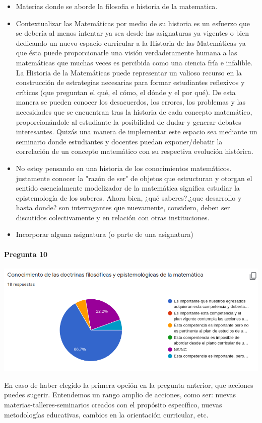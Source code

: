 \documentclass[a4paper,10pt,BCOR10mm,oneside,headsepline]{scrbook}
\begin{document}
\begin{subappendices}
\begin{itemize}
\item Materias donde se aborde la filosofia e historia de la matematica.

\item Contextualizar las Matemáticas por medio de su historia es un esfuerzo que se debería al menos intentar ya sea desde las asignaturas ya vigentes o bien dedicando un nuevo espacio curricular  a la Historia de las Matemáticas ya que ésta puede proporcionarle una visión verdaderamente humana a las matemáticas que muchas veces es percibida como una ciencia fría e infalible.  
La Historia de la Matemáticas puede representar un valioso recurso en la construcción de estrategias necesarias para formar estudiantes reflexivos y críticos (que preguntan el qué, el cómo, el dónde y el por qué). De esta manera se pueden conocer los desacuerdos, los errores, los problemas y las necesidades que se encuentran tras la historia de cada concepto matemático,  proporcionándole al estudiante la posibilidad de dudar y generar debates interesantes. Quizás una manera de implementar este espacio sea mediante un seminario donde estudiantes y docentes puedan exponer/debatir la correlación de un concepto matemático con su respectiva evolución histórica.  

\item No estoy pensando en una historia de los conocimientos matemáticos. justamente conocer la "razón de ser" de objetos  que estructuran y otorgan el sentido esencialmente modelizador de la matemática significa estudiar la epistemología de los saberes.  Ahora bien, ¿qué saberes?,¿que desarrollo y hasta donde? son interrogantes que nuevamente, considero, deben ser discutidos colectivamente y en relación con otras instituciones. 

\item Incorporar alguna asignatura (o parte de una asignatura)
 
 
\end{itemize}


  \paragraph{Pregunta 10}
\begin{center}
 
\includegraphics[scale=.9]{doc10.png}
 \end{center}
En caso de haber elegido la primera opción en la pregunta anterior, que acciones puedes sugerir. Entendemos un rango amplio de acciones, como ser: nuevas materias-talleres-seminarios creados con el propósito específico, nuevas metodologías educativas, cambios en la orientación curricular, etc.


\end{subappendices}
\end{document}
